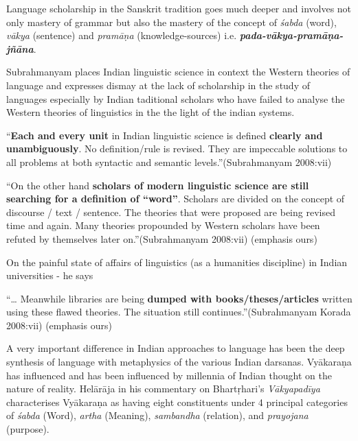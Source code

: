Language scholarship in the Sanskrit tradition goes much deeper and involves not only mastery of grammar but also the mastery of the concept of \textit{śabda} (word), \textit{vākya} (sentence) and \textit{pramāṇa} (knowledge-sources) i.e. \textbf{\textit{pada-vākya-pramāṇa-jñāna}}.

Subrahmanyam places Indian linguistic science in context the Western theories of language and expresses dismay at the lack of scholarship in the study of languages especially by Indian taditional scholars who have failed to analyse the Western theories of linguistics in the the light of the indian systems.

\begin{myquote}
“\textbf{Each and every unit} in Indian linguistic science is defined \textbf{clearly and unambiguously}. No definition/rule is revised. They are impeccable solutions to all problems at both syntactic and semantic levels.”\hfill (Subrahmanyam 2008:vii)
\end{myquote}

\begin{myquote}
“On the other hand \textbf{scholars of modern linguistic science are still searching for a definition of “word”}. Scholars are divided on the concept of discourse / text / sentence. The theories that were proposed are being revised time and again. Many theories propounded by Western scholars have been refuted by themselves later on.”\hfill (Subrahmanyam 2008:vii) (emphasis ours)
\end{myquote}

On the painful state of affairs of linguistics (as a humanities discipline) in Indian universities - he says

\begin{myquote}
“… Meanwhile libraries are being \textbf{dumped with books/theses/articles} written using these flawed theories. The situation still continues.”\hfill (Subrahmanyam Korada 2008:vii) (emphasis ours)
\end{myquote}

A very important difference in Indian approaches to language has been the deep synthesis of language with metaphysics of the various Indian darsanas. Vyākaraṇa has influenced and has been influenced by millennia of Indian thought on the nature of reality. Helārāja in his commentary on Bhartṛhari’s \textit{Vākyapadīya} characterises Vyākaraṇa as having eight constituents under 4 principal categories of \textit{śabda} (Word), \textit{artha} (Meaning), \textit{sambandha} (relation), and \textit{prayojana} (purpose).


